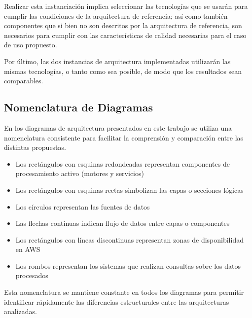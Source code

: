 Realizar esta instanciación implica seleccionar las tecnologías que se usarán para cumplir las condiciones de la arquitectura de referencia; 
así como también componentes que si bien no son descritos por la arquitectura de referencia, son necesarios para cumplir con las características de calidad
necesarias para el caso de uso propuesto.\newline

Por último, las dos instancias de arquitectura implementadas utilizarán las mismas tecnologías, o tanto como sea posible, de modo que los resultados sean comparables.  

\newpage

\subsection{Nomenclatura de Diagramas}

En los diagramas de arquitectura presentados en este trabajo se utiliza una nomenclatura consistente para facilitar la comprensión y comparación entre las distintas propuestas.

\begin{itemize}
    \item Los rectángulos con esquinas redondeadas representan componentes de procesamiento activo (motores y servicios)
    \item Los rectángulos con esquinas rectas simbolizan las capas o secciones lógicas
    \item Los círculos representan las fuentes de datos
    \item Las flechas continuas indican flujo de datos entre capas o componentes
    \item Los rectángulos con líneas discontinuas representan zonas de disponibilidad en AWS
    \item Los rombos representan los sistemas que realizan consultas sobre los datos procesados
\end{itemize}
 
Esta nomenclatura se mantiene constante en todos los diagramas para permitir identificar rápidamente las diferencias estructurales entre las arquitecturas analizadas.
\newpage